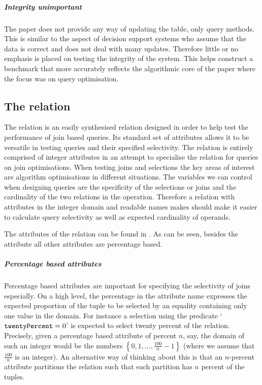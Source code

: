 \subparagraph{Integrity unimportant} The paper \relalg{} does not provide any way of
updating the table, only query methods. This is similar to the aspect of
decision support systems who assume that the data is correct and
does not deal with many updates. Therefore little or no emphasis is placed on
testing the integrity of the system. This helps construct a benchmark that more
accurately reflects the algorithmic core of the paper where the focus was on
query optimisation.

\subsection{The  relation}\label{sec:benchmark:joinbench}
The  relation is an easily synthesised relation designed in
order to help test the performance of join based queries. Its standard set of
attributes allows it to be versatile in testing queries and their specified selectivity.
The relation is entirely comprised of integer attributes in an
attempt to specialise the relation for queries on join optimisations. When
testing joins and selections the key areas of interest are algorithm
optimisations in different situations. The variables we can control when
designing queries are the specificity of the selections or joins and the cardinality
of the two relations in the operation. Therefore a relation with attributes in
the integer domain and readable names makes should make it easier to calculate
query selectivity as well as expected cardinality of operands.

The attributes of the  relation can be found in
. As can be seen, besides the
 attribute all other attributes are percentage based.

\subparagraph{Percentage based attributes} Percentage based attributes are
important for specifying the selectivity of joins especially. On a high level,
the percentage in the attribute name expresses the expected proportion of the
tuple to be selected by an equality containing only one value in the domain. For
instance a selection using the predicate `$\mathtt{twentyPercent} =
0$' is expected to select twenty percent of the relation. Precisely, given a
percentage based attribute of percent $n$, say, the domain of such an integer
would be the numbers $\left\{0, 1, \ldots, \frac{100}{n} - 1\right\}$ (where we
assume that $\frac{100}{n}$ is an integer). An alternative way of thinking about
this is that an $n$-percent attribute partitions the relation such that each
partition has $n$ percent of the tuples.

